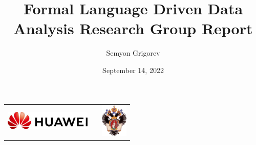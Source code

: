 \documentclass[xcolor=table,aspectratio=169]{beamer}
\title[FLDDA Research Group Report]{Formal Language Driven Data Analysis Research Group Report}
\institute[SPbSU]{
Saint Petersburg State University
}
\author[Semyon Grigorev]{Semyon Grigorev}
\date{September 14, 2022}
\begin{document}
{
\begin{frame}[fragile]
  \begin{table}
  \centering
  \begin{tabularx}{\linewidth}{XcX}
    \includegraphics[height=0.9cm]{pictures/hu_logo.jpeg} \hfill
    & 
    & \hfill \includegraphics[height=1.6cm]{pictures/SPbGU_Logo.png}
  \end{tabularx}
  \end{table}
  \titlepage
\end{frame}
}
\end{document}
